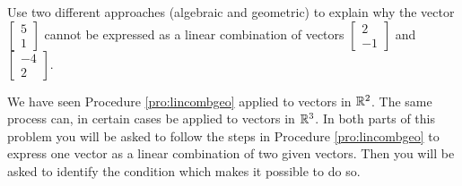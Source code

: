 \documentclass{ximera}
\begin{document}
\begin{problem}\label{prob:lincombtwovectors3}
Use two different approaches (algebraic and geometric) to explain why the vector $\begin{bmatrix}5\\1\end{bmatrix}$ cannot be expressed as a linear combination of vectors $\begin{bmatrix}2\\-1\end{bmatrix}$ and $\begin{bmatrix}-4\\2\end{bmatrix}$.
\end{problem}

\begin{problem}%
We have seen Procedure \ref{pro:lincombgeo} applied to vectors in $\mathbb{R}^2$.  The same process can, in certain cases be applied to vectors in $\mathbb{R}^3$.  In both parts of this problem you will be asked to follow the steps in Procedure \ref{pro:lincombgeo} to express one vector as a linear combination of two given vectors.  Then you will be asked to identify the condition which makes it possible to do so.


\end{problem}
\end{document}
